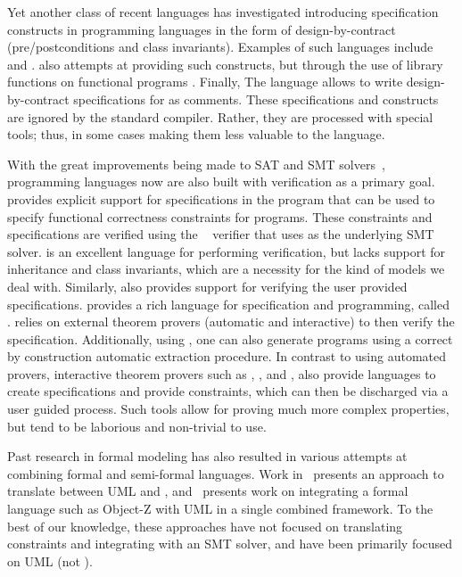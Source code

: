 Yet another class of recent languages has investigated introducing
specification constructs in programming languages in the form of
design-by-contract (pre/postconditions and class invariants). Examples
of such languages include \eiffel{} \cite{meyer1988eiffel} and
\specsharp{} \cite{barnett2011specification}.  \scala{} also attempts
at providing such constructs, but through the use of library functions
on functional programs \cite{odersky-rv10}. Finally, The \jml{}
language \cite{leavens1998jml} allows to write design-by-contract
specifications for \java{} as comments. These specifications and
constructs are ignored by the standard \java{} compiler. Rather, they
are processed with special tools; thus, in some cases making them less
valuable to the language.

With the great improvements being made to SAT and SMT
solvers~\cite{smt-lib,de2008z3}, programming languages now are also
built with verification as a primary goal. \dafny{}
\cite{leino-lpar-2010} provides explicit support for specifications in
the program that can be used to specify functional correctness
constraints for programs. These constraints and specifications are
verified using the \boogie{}~\cite{barnett2006boogie} verifier that
uses \zthree{} as the underlying SMT solver. \dafny{} is an excellent
language for performing verification, but lacks support for
inheritance and class invariants, which are a necessity for the kind
of models we deal with. Similarly, \specsharp{} also provides support
for verifying the user provided specifications. \whythree{}
\cite{filliatre-why3-2011} provides a rich language for specification
and programming, called \whyml{}. \whythree{} relies on external
theorem provers (automatic and interactive) to then verify the
specification. Additionally, using \whyml{}, one can also generate
\ocaml{} programs using a correct by construction automatic extraction
procedure. In contrast to using automated provers, interactive theorem
provers such as \pvs{} \cite{cade92-pvs,pvs-website}, \coq{}
\cite{barras1997coq}, and \isabelle{} \cite{nipkow2002isabelle}, also
provide languages to create specifications and provide constraints,
which can then be discharged via a user guided process. Such tools
allow for proving much more complex properties, but tend to be
laborious and non-trivial to use.

Past research in formal modeling has also resulted in various attempts
at combining formal and semi-formal languages. Work
in~\cite{lausdahl2009connecting} presents an approach to translate
between UML and \vdmpp{}, and~\cite{kim2005mda} presents work on
integrating a formal language such as Object-Z with UML in a single
combined framework. To the best of our knowledge, these approaches
have not focused on translating constraints and integrating with an
SMT solver, and have been primarily focused on UML (not \sysml).

